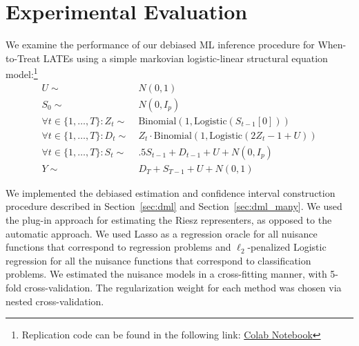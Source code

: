 \section{Experimental Evaluation}

We examine the performance of our debiased ML inference procedure for When-to-Treat LATEs using a simple markovian logistic-linear structural equation model:\footnote{Replication code can be found in the following link: \href{https://colab.research.google.com/drive/1xprRVEziMj_ixemxtsIgaZFy_CqvFrFq?usp=sharing}{Colab Notebook}}
\begin{align}
    U \sim~& N(0, 1)\\
    S_0 \sim~& N(0, I_p)\\
\forall t \in \{1,\ldots, T\}: 
    Z_{t} \sim~& \text{Binomial}(1, \text{Logistic}(S_{t-1}[0]))\\
\forall t \in \{1,\ldots, T\}: 
    D_t \sim~& Z_t \cdot \text{Binomial}(1, \text{Logistic}(2Z_t - 1 + U))\\
\forall t \in \{1,\ldots, T\}: 
    S_t \sim~& .5 S_{t-1} + D_{t-1} + U + N(0, I_p)\\
    Y \sim~& D_T + S_{T-1} + U + N(0, 1)
\end{align}

We implemented the debiased estimation and confidence interval construction procedure described in Section~\ref{sec:dml} and Section~\ref{sec:dml_many}. We used the plug-in approach for estimating the Riesz representers, as opposed to the automatic approach. We used Lasso as a regression oracle for all nuisance functions that correspond to regression problems and $\ell_2$-penalized Logistic regression for all the nuisance functions that correspond to classification problems. We estimated the nuisance models in a cross-fitting manner, with 5-fold cross-validation. The regularization weight for each method was chosen via nested cross-validation.


